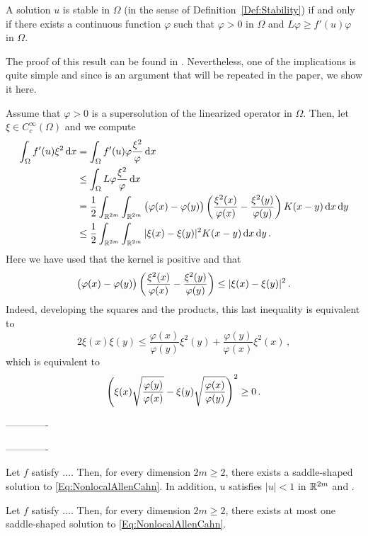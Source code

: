 \begin{lemma}
	\label{Lemma:EquivalenceStability}
	A solution $u$ is stable in $\Omega$ (in the sense of Definition~\ref{Def:Stability}) if and only if there exists a continuous function $\varphi$ such that $\varphi > 0$ in $\Omega$ and $L\varphi \geq f'(u) \varphi$ in $\Omega$.
\end{lemma}

The proof of this result can be found in \cite{HamelRosOtonSireValdinoci}. Nevertheless, one of the implications is quite simple and since is an argument that will be repeated in the paper, we show it here. 

Assume that $\varphi > 0$ is a supersolution of the linearized operator in $\Omega$. Then, let $\xi \in C^\infty_c (\Omega)$ and we compute
\begin{align*}
	\int_\Omega f'(u) \xi^2 \,\mathrm{d} x &= \int_\Omega f'(u) \varphi \dfrac{\xi^2}{\varphi} \,\mathrm{d} x \\
	&\leq \int_\Omega L\varphi \dfrac{\xi^2}{\varphi}  \,\mathrm{d} x \\ 
	&= \dfrac{1}{2} \int_{\mathbb{R}^{2m}} \int_{\mathbb{R}^{2m}} \big ( \varphi(x) - \varphi(y) \big) \left ( {\dfrac{\xi^2(x)}{\varphi(x)} - \dfrac{\xi^2(y)}{\varphi(y)} }\right ) K(x - y) \,\mathrm{d} x \,\mathrm{d} y
	 \\ 
	&\leq \dfrac{1}{2} \int_{\mathbb{R}^{2m}} \int_{\mathbb{R}^{2m}} |\xi (x) - \xi(y)|^2 K(x - y) \,\mathrm{d} x \,\mathrm{d} y\,.
\end{align*}
Here we have used that the kernel is positive and that
$$
\big ( \varphi(x) - \varphi(y) \big) \left ( {\dfrac{\xi^2(x)}{\varphi(x)} - \dfrac{\xi^2(y)}{\varphi(y)} }\right ) \leq |\xi (x) - \xi(y)|^2\,.
$$
Indeed, developing the squares and the products, this last inequality is equivalent to
$$
2 \xi(x) \xi(y) \leq \dfrac{\varphi(x)}{\varphi(y)} \xi^2(y) +  \dfrac{\varphi(y)}{\varphi(x)} \xi^2 (x)\,,
$$
which is equivalent to
$$
\left ( {\xi (x)\sqrt{\dfrac{\varphi(y)}{\varphi(x)}} - \xi(y) \sqrt{\dfrac{\varphi(x)}{\varphi(y)} } }\right )^2 \geq 0\,.
$$

\bigskip
\bigskip
\bigskip
-------------
\bigskip
\bigskip
\bigskip


\bigskip
\bigskip
\bigskip
-------------
\bigskip
\bigskip
\bigskip

\begin{theorem}
	\label{Th:Existence}
    Let $f$ satisfy .... Then, for every dimension $2m \geq 2$, there exists a saddle-shaped solution to \eqref{Eq:NonlocalAllenCahn}. In addition, $u$ satisfies $|u|<1$ in $\mathbb{R}^{2m}$ and .
\end{theorem}


\begin{theorem}
	\label{Th:Uniqueness}
    Let $f$ satisfy .... Then, for every dimension $2m \geq 2$, there exists at most one saddle-shaped solution to \eqref{Eq:NonlocalAllenCahn}.
\end{theorem}

